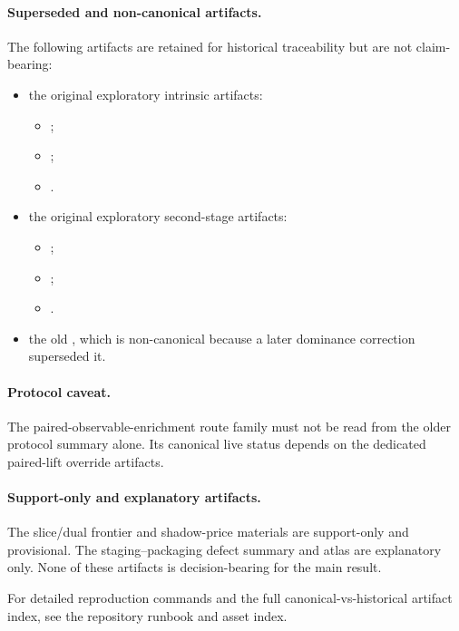 \documentclass[11pt]{article}
\theoremstyle{definition}
\begin{document}
\paragraph{Superseded and non-canonical artifacts.}
The following artifacts are retained for historical traceability but are not claim-bearing:
\begin{itemize}
\item the original exploratory intrinsic artifacts:
  \begin{itemize}[leftmargin=1.5em]
  \item {};
  \item {};
  \item {}.
  \end{itemize}
\item the original exploratory second-stage artifacts:
  \begin{itemize}[leftmargin=1.5em]
  \item {};
  \item {};
  \item {}.
  \end{itemize}
\item the old , which is non-canonical because a later dominance correction superseded it.
\end{itemize}

\paragraph{Protocol caveat.}
The paired-observable-enrichment route family must not be read from the older protocol summary alone. Its canonical live status depends on the dedicated paired-lift override artifacts.

\paragraph{Support-only and explanatory artifacts.}
The slice/dual frontier and shadow-price materials are support-only and provisional. The staging--packaging defect summary and atlas are explanatory only. None of these artifacts is decision-bearing for the main result.

For detailed reproduction commands and the full canonical-vs-historical artifact index, see the repository runbook and asset index.
\end{document}

